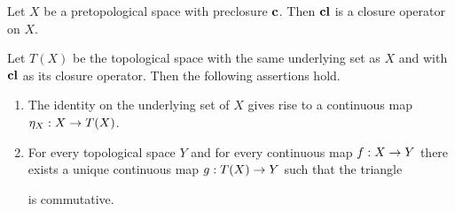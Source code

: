 \begin{theorem}\label{theorem:topological_spaces_are_reflective_subcategory_of_pretopological_spaces}
	Let $X$ be a pretopological space with preclosure $\mathbf{c}$. Then $\mathbf{cl}$ is a closure operator on $X$.

	Let $T(X)$ be the topological space with the same underlying set as $X$ and with $\mathbf{cl}$ as its closure operator. Then the following assertions hold.
	\begin{enumerate}[label=\emph{\textbf{(\arabic*)}}, leftmargin=3.0em]
		\item The identity on the underlying set of $X$ gives rise to a continuous map $\eta_{X}:X \rightarrow T(X)$.
		\item For every topological space $Y$ and for every continuous map $f:X \rightarrow Y$ there exists a unique continuous map $g:T(X) \rightarrow Y$ such that the triangle
		      \begin{center}
		      \end{center}
		      is commutative.
	\end{enumerate}
\end{theorem}

